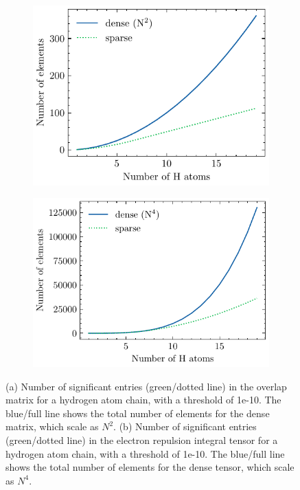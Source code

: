 \begin{figure}[h]
\centering
\begin{subfigure}{0.45\linewidth}
\includegraphics[scale=0.8]{Pics/overlap_nze}
\caption{}
\end{subfigure}
\begin{subfigure}{0.45\linewidth}
\includegraphics[scale=0.8]{Pics/eri_nze}
\caption{}
\end{subfigure}%
\caption[Sparsity of overlap and electron repulsion integrals]{(a) Number of significant entries (green/dotted line) in the overlap matrix for a hydrogen atom chain, with a threshold of 1e-10. The blue/full line shows the total number of elements for the dense matrix, which scale as $N^2$. (b) Number of significant entries (green/dotted line) in the electron repulsion integral tensor for a hydrogen atom chain, with a threshold of 1e-10. The blue/full line shows the total number of elements for the dense tensor, which scale as $N^4$.}
\label{fig:HCHAIN_ERINZE}
\end{figure}

